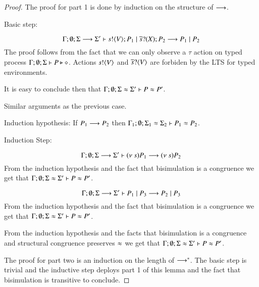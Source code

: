 \begin{proof}
	The proof for part 1 is done by induction on the structure of $\longrightarrow$.



%
%
	Basic step:

	\[
		\Gamma; \emptyset; \Sigma \longrightarrow \Sigma' \vdash s ! \langle V \rangle ; P_1 \;|\; \overline{s} ? (X) ; P_2 \longrightarrow P_1 \;|\; P_2
	\]
	The proof follows from the fact that we can only observe a $\tau$
	action on typed process
	$\Gamma; \emptyset; \Sigma \vdash P \triangleright \diamond$.
	Actions $s ! \langle V \rangle$ and $\overline{s} ? \langle V \rangle$
	are forbiden by the LTS for typed environments.

	It is easy to conclude then that $\Gamma; \emptyset; \Sigma \approx \Sigma' \vdash P \approx P'$.


	Similar arguments as the previous case.

	Induction hypothesis:
	If $P_1 \longrightarrow P_2$ then
	$\Gamma_1; \emptyset; \Sigma_1 \approx \Sigma_2 \vdash P_1 \approx P_2$.

	Induction Step:

	\[
		\Gamma; \emptyset; \Sigma \longrightarrow \Sigma' \vdash (\nu\ s){P_1} \longrightarrow (\nu\ s) P_2
	\]
	From the induction hypothesis and the fact that bisimulation is a congruence
	we get that $\Gamma; \emptyset; \Sigma \approx \Sigma' \vdash P \approx P'$.


	\[
		\Gamma; \emptyset; \Sigma \longrightarrow \Sigma' \vdash P_1 \;|\; P_3 \longrightarrow P_2 \;|\; P_3
	\]
	From the induction hypothesis and the fact that bisimulation is a congruence
	we get that $\Gamma; \emptyset; \Sigma \approx \Sigma' \vdash P \approx P'$.


	From the induction hypothesis and the facts that bisimulation is a congruence
	and structural congruence preserves $\approx$
	we get that $\Gamma; \emptyset; \Sigma \approx \Sigma' \vdash P \approx P'$.


	The proof for part two is an induction on the length of $\longrightarrow^*$.
	The basic step is trivial and the inductive step
	deploys part 1 of this lemma and the fact that bisimulation is
	transitive to conclude.
\end{proof}


